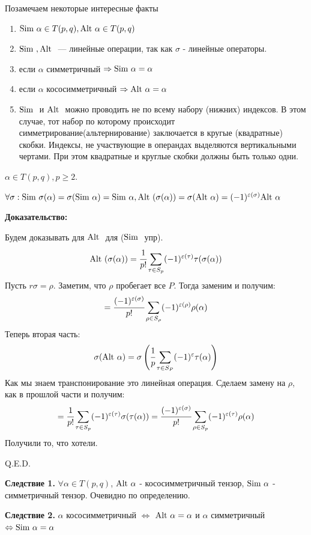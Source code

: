 Позамечаем некоторые интересные факты 
\begin{enumerate}
    \item $\text{Sim } \alpha \in T(p,q), \text{Alt } \alpha \in T(p,q) $ 
    \item $\text{Sim }, \text{Alt }$ --- линейные операции, так как $\sigma$ - линейные операторы.
    \item если $\alpha$ симметричный $\Rightarrow \text{Sim } \alpha = \alpha$
    \item  если $\alpha$ кососимметричный $\Rightarrow \text{Alt } \alpha = \alpha$
    \item $\text{Sim }$ и $\text{Alt }$ можно проводить не по всему набору (нижних) индексов. В этом случае, тот набор по которому происходит симметрирование(альтернирование) заключается в кругые (квадратные) скобки. Индексы, не участвующие в операндах выделяются вертикальными чертами. При этом квадратные и круглые скобки должны быть только одни.

\end{enumerate}


$\alpha \in T(p,q), p \geq 2.$ 

$\forall \sigma: \text{Sim } \sigma(\alpha) = \sigma(\text{Sim } \alpha) = \text{Sim } \alpha, \text{Alt }(\sigma(\alpha)) = \sigma(\text{Alt }\alpha) = (-1)^{\varepsilon(\sigma)}\text{Alt } \alpha$

\textbf{Доказательство:}

Будем доказывать для $\text{Alt }$ для ($\text{Sim }$ упр).
$$\text{Alt } (\sigma(\alpha))=\cfrac{1}{p!}\sum\limits_{\tau\in S_p}(-1)^{\varepsilon(\tau)}\tau(\sigma(\alpha))$$
Пусть $r \sigma = \rho$. Заметим, что $\rho$ пробегает все $P$. Тогда заменим и получим:
$$=  \cfrac{(-1)^{\varepsilon(\sigma)}}{p!}\sum\limits_{\rho \in S_\rho} (-1)^{\varepsilon(\rho)}\rho(\alpha)$$
Теперь вторая часть:
$$\sigma(\text{Alt } \alpha) = \sigma\left(\cfrac{1}{p}\sum_{\tau\in S_P}(-1)^{\varepsilon}\tau(\alpha)\right)$$
Как мы знаем транспонирование это линейная операция. Сделаем замену на $\rho$, как в прошлой части и получим:
$$= \cfrac{1}{p!}\sum\limits_{\tau \in S_p}(-1)^{\varepsilon(\tau)}\sigma(\tau(\alpha)) = \cfrac{(-1)^{\varepsilon(\sigma)}}{p!}\sum\limits_{\rho \in S_p}(-1)^{\varepsilon(\tau)} \rho(\alpha)$$
Получили то, что хотели.

\hfill Q.E.D.

\textbf{Следствие 1.} $\forall \alpha \in T(p,q)$, $\text{Alt } \alpha$ - кососимметричный тензор, $\text{Sim } \alpha$ - симметричный тензор. Очевидно по определению.

\textbf{Следствие 2.} $\alpha$ кососимметричный $\Leftrightarrow$ $\text{Alt } \alpha= \alpha$ и $\alpha$ симметричный $\Leftrightarrow \text{Sim } \alpha = \alpha$


